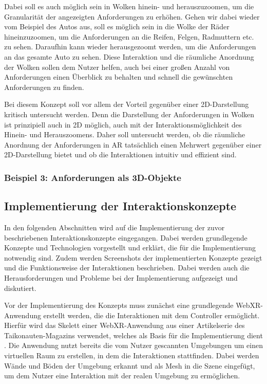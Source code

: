 Dabei soll es auch möglich sein in Wolken hinein- und herauszuzoomen, um die Granularität der angezeigten Anforderungen zu erhöhen.
Gehen wir dabei wieder vom Beispiel des Autos aus, soll es möglich sein in die Wolke der Räder hineinzuzoomen, um die Anforderungen an die Reifen, Felgen, Radmuttern etc. zu sehen.
Daraufhin kann wieder herausgezoomt werden, um die Anforderungen an das gesamte Auto zu sehen.
Diese Interaktion und die räumliche Anordnung der Wolken sollen dem Nutzer helfen, auch bei einer großen Anzahl von Anforderungen einen Überblick zu behalten und schnell die gewünschten Anforderungen zu finden.

Bei diesem Konzept soll vor allem der Vorteil gegenüber einer 2D-Darstellung kritisch untersucht werden.
Denn die Darstellung der Anforderungen in Wolken ist prinzipiell auch in 2D möglich, auch mit der Interaktionsmöglichkeit des Hinein- und Herauszoomens.
Daher soll untersucht werden, ob die räumliche Anordnung der Anforderungen in AR tatsächlich einen Mehrwert gegenüber einer 2D-Darstellung bietet und ob die Interaktionen intuitiv und effizient sind.


\subsubsection{Beispiel 3: Anforderungen als 3D-Objekte}

\subsection{Implementierung der Interaktionskonzepte}

In den folgenden Abschnitten wird auf die Implementierung der zuvor beschriebenen Interaktionskonzepte eingegangen.
Dabei werden grundlegende Konzepte und Technologien vorgestellt und erklärt, die für die Implementierung notwendig sind.
Zudem werden Screenshots der implementierten Konzepte gezeigt und die Funktionsweise der Interaktionen beschrieben.
Dabei werden auch die Herausforderungen und Probleme bei der Implementierung aufgezeigt und diskutiert.

Vor der Implementierung des Konzepts muss zunächst eine grundlegende WebXR-Anwendung erstellt werden, die die Interaktionen mit dem Controller ermöglicht.
Hierfür wird das Skelett einer WebXR-Anwendung aus einer Artikelserie des Taikonauten-Magazins verwendet, welches als Basis für die Implementierung dient \autocite[][]{taikonauten-magazine}.
Die Anwendung nutzt bereits die vom Nutzer gescannten Umgebungen um einen virtuellen Raum zu erstellen, in dem die Interaktionen stattfinden.
Dabei werden Wände und Böden der Umgebung erkannt und als Mesh in die Szene eingefügt, um dem Nutzer eine Interaktion mit der realen Umgebung zu ermöglichen.

